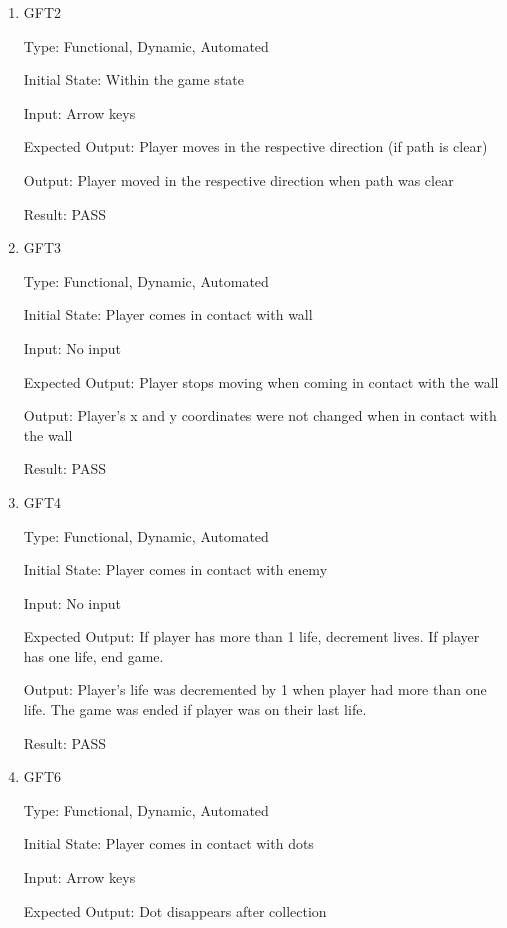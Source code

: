 \documentclass[12pt, titlepage]{article}
\begin{document}
\begin{enumerate}

\item{GFT2\\}

Type: Functional, Dynamic, Automated
					
Initial State: Within the game state
					
Input: Arrow keys
					
Expected Output: Player moves in the respective direction (if path is clear)

Output: Player moved in the respective direction when path was clear
					
Result: PASS

\item{GFT3\\}

Type: Functional, Dynamic, Automated
					
Initial State: Player comes in contact with wall
					
Input: No input
					
Expected Output: Player stops moving when coming in contact with the wall

Output: Player's x and y coordinates were not changed when in contact with the wall

Result: PASS

\item{GFT4\\}

Type: Functional, Dynamic, Automated
					
Initial State: Player comes in contact with enemy
					
Input: No input
					
Expected Output: If player has more than 1 life, decrement lives. If player has one life, end game.

Output: Player's life was decremented by 1 when player had more than one life. The game was ended if player was on their last life.

Result: PASS

\item{GFT6\\}

Type: Functional, Dynamic, Automated
					
Initial State: Player comes in contact with dots
					
Input: Arrow keys
					
Expected Output: Dot disappears after collection


\end{enumerate}
\end{document}
